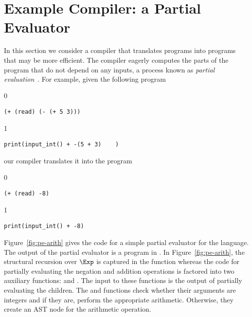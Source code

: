 \documentclass[7x10]{TimesAPriori_MIT}%
\def\racketEd{0}
\def\pythonEd{1}
\def\edition{1}
\begin{document}
\section{Example Compiler: a Partial Evaluator}
\label{sec:partial-evaluation}

In this section we consider a compiler that translates \LangInt{}
programs into \LangInt{} programs that may be more efficient. The
compiler eagerly computes the parts of the program that do not depend
on any inputs, a process known as \emph{partial
evaluation}~\citep{Jones:1993uq}.  
For example, given the following program
{\if\edition\racketEd
\begin{lstlisting}
(+ (read) (- (+ 5 3)))
\end{lstlisting}
\fi}
{\if\edition\pythonEd
\begin{lstlisting}
print(input_int() + -(5 + 3)    )
\end{lstlisting}
\fi}
\noindent our compiler translates it into the program
{\if\edition\racketEd
\begin{lstlisting}
(+ (read) -8)
\end{lstlisting}
\fi}
{\if\edition\pythonEd
\begin{lstlisting}
print(input_int() + -8)
\end{lstlisting}
\fi}

Figure~\ref{fig:pe-arith} gives the code for a simple partial
evaluator for the \LangInt{} language. The output of the partial evaluator
is a program in \LangInt{}. In Figure~\ref{fig:pe-arith}, the structural
recursion over $\Exp$ is captured in the  function
whereas the code for partially evaluating the negation and addition
operations is factored into two auxiliary functions:
 and . The input to these 
functions is the output of partially evaluating the children.
The  and  functions check whether their
arguments are integers and if they are, perform the appropriate
arithmetic.  Otherwise, they create an AST node for the arithmetic
operation.
\end{document}
